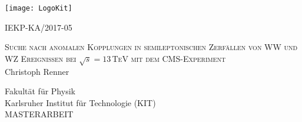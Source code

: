 \begin{titlepage}
  \begin{addmargin}[0cm]{0cm}
    \thispagestyle{empty}
    \vspace{-1cm}
    \begin{center}

	\end{center}
  		\begin{minipage}{0.5\textwidth}
  			\texttt{[image: LogoKit]}
  		\end{minipage}%
  		\begin{minipage}{0.5\textwidth}
  			\hspace{3.5cm}IEKP-KA/2017-05
  		\end{minipage}

	\vspace{2cm}
	\begin{center}
\vspace{0.8cm}

  \Large{\textsc{Suche nach anomalen Kopplungen in semileptonischen Zerf\"allen von WW und WZ Ereignissen bei $\sqrt{s}=13$\,TeV mit dem CMS-Experiment}}\\

\vspace{0.9cm}
\Large{Christoph Renner}\\
\vspace{0.9cm}
\vspace{1cm}
\large{Fakult\"at f\"ur Physik\\
  
  Karlsruher Institut f\"ur Technologie (KIT)\\
  \vspace{0.825 cm}
  \large{MASTERARBEIT}\\
  \vspace{0.825 cm}

}
\end{center}
\end{addmargin}
\end{titlepage}
